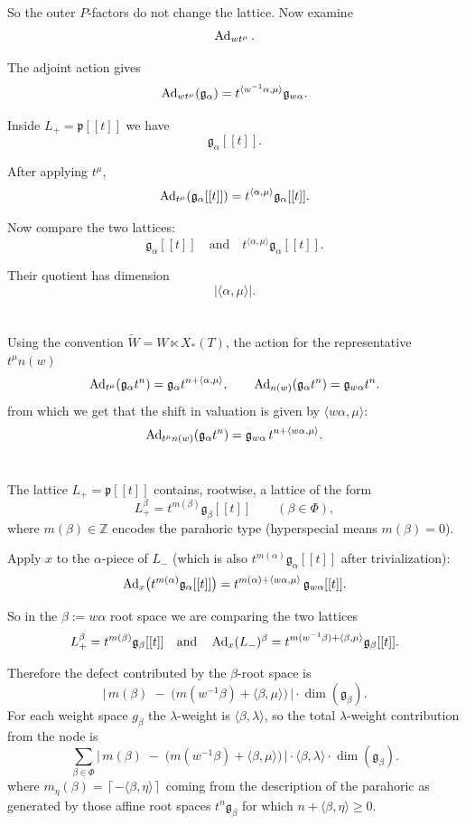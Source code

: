 \documentclass[12pt]{article}
\begin{document}
So the outer $P$-factors do not change the lattice. Now examine
\[
\operatorname{Ad}_{w t^\mu}.
\]

The adjoint action gives
\[
\operatorname{Ad}_{w t^\mu}(\mathfrak{g}_\alpha) = t^{\langle w^{-1}\alpha,\mu\rangle}\mathfrak{g}_{w\alpha}.
\]

Inside $L_+ = \mathfrak{p}[[t]]$ we have
\[
\mathfrak{g}_\alpha[[t]].
\]

After applying $t^\mu$,
\[
\operatorname{Ad}_{t^\mu}(\mathfrak{g}_\alpha[[t]]) = t^{\langle \alpha, \mu\rangle}\mathfrak{g}_\alpha[[t]].
\]

Now compare the two lattices:
\[
\mathfrak{g}_\alpha[[t]]
\quad \text{and} \quad
t^{\langle \alpha,\mu\rangle}\mathfrak{g}_\alpha[[t]].
\]

Their quotient has dimension
\[
|\langle \alpha,\mu\rangle|.
\]

\section{}
Using the convention $\tilde W = W \ltimes X_*(T)$, the action for the representative $t^\mu n(w)$
\[
\operatorname{Ad}_{t^\mu}(\mathfrak g_\alpha t^n) = \mathfrak g_\alpha t^{n+\langle \alpha,\mu\rangle},
\qquad
\operatorname{Ad}_{n(w)}(\mathfrak g_\alpha t^n)=\mathfrak g_{w\alpha} t^n.
\] from which we get that the shift in valuation is given by $\langle w\alpha,\mu\rangle$:
\[
\operatorname{Ad}_{t^\mu n(w)}(\mathfrak g_\alpha t^n)=\mathfrak g_{w\alpha}\, t^{n+\langle w\alpha,\mu\rangle}.
\]


\section{}
The lattice $L_+=\mathfrak p[[t]]$ contains, rootwise, a lattice of the form
\[
L_+^{\beta}=t^{m(\beta)}\mathfrak g_\beta[[t]]
\qquad(\beta\in\Phi),
\]
where $m(\beta)\in\mathbb Z$ encodes the parahoric type (hyperspecial means $m(\beta)=0$).

Apply $x$ to the $\alpha$-piece of $L_-$ (which is also $t^{m(\alpha)}\mathfrak g_\alpha[[t]]$ after trivialization):
\[
\operatorname{Ad}_x\bigl(t^{m(\alpha)}\mathfrak g_\alpha[[t]]\bigr)
=
t^{m(\alpha)+\langle w\alpha,\mu\rangle}\,\mathfrak g_{w\alpha}[[t]].
\]

So in the $\beta:=w\alpha$ root space we are comparing the two lattices
\[
L_+^\beta = t^{m(\beta)}\mathfrak g_\beta[[t]]
\quad\text{and}\quad
\operatorname{Ad}_x(L_-)^\beta = t^{m(w^{-1}\beta)+\langle \beta,\mu\rangle}\mathfrak g_\beta[[t]].
\]

Therefore the defect contributed by the $\beta$-root space is
\[
\boxed{
\bigl|\,m(\beta)\;-\;\bigl(m(w^{-1}\beta)+\langle \beta,\mu\rangle\bigr)\,\bigr|
\cdot \dim(\mathfrak g_\beta).
}
\]
For each weight space $g_\beta$ the $\lambda$-weight is $\langle \beta,\lambda\rangle$, so the total $\lambda$-weight contribution from the node is
\[
\boxed{\sum_{\beta\in\Phi} \bigl|\,m(\beta)\;-\;\bigl(m(w^{-1}\beta)+\langle \beta,\mu\rangle\bigr)\,\bigr| \cdot \langle \beta,\lambda\rangle \cdot \dim(\mathfrak g_\beta)}.
\]
where $
m_\eta(\beta)=\left\lceil -\langle \beta,\eta\rangle \right\rceil$ coming from the description of the parahoric as generated by those affine root spaces $t^n\mathfrak g_\beta$ for which $n+\langle \beta,\eta\rangle \ge 0$.
\end{document}
